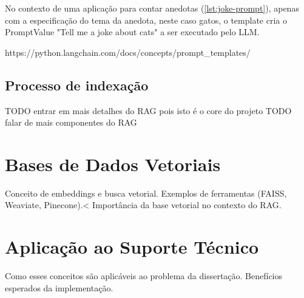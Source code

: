 No contexto de uma aplicação para contar anedotas (\ref{lst:joke-prompt}), apenas com a especificação do tema da anedota, neste caso gatos, o template cria o PromptValue "Tell me a joke about cats"  a ser executado pelo LLM.


https://python.langchain.com/docs/concepts/prompt\_templates/


\subsection{Processo de indexação}

TODO entrar em mais detalhes do RAG pois isto é o core do projeto
TODO falar de mais componentes do RAG


\section{Bases de Dados Vetoriais}

Conceito de embeddings e busca vetorial.
Exemplos de ferramentas (FAISS, Weaviate, Pinecone).<
Importância da base vetorial no contexto do RAG.

\section{Aplicação ao Suporte Técnico}

Como esses conceitos são aplicáveis ao problema da dissertação.
Benefícios esperados da implementação.
